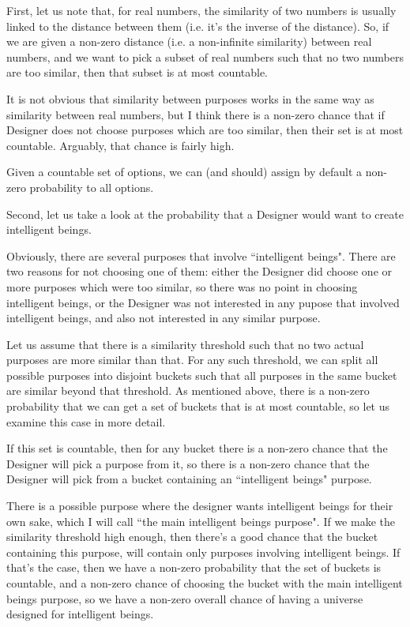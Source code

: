 \documentclass[a4paper
]{article}
\newcommand{\ghilimele}[1]{``#1"}
\begin{document}
First, let us note that, for real numbers, the similarity of two numbers
is usually linked to the distance between them
(i.e. it's the inverse of the distance).
So, if we are given a
non-zero distance (i.e. a non-infinite similarity) between real numbers,
and we want to pick a subset of real numbers such that no two numbers are
too similar, then that subset is at most countable.

It is not obvious that
similarity between purposes works in the same way as similarity between
real numbers, but I think there is a non-zero chance
that if Designer does not choose purposes which are too similar,
then their set is at most countable.
Arguably, that chance is fairly high.

Given a countable set of options, we can (and should) assign by default
a non-zero probability to all options.

Second, let us take a look at the probability that a Designer would want to
create intelligent beings.

Obviously, there are several purposes that involve
\ghilimele{intelligent beings}.
There are two reasons for not choosing one
of them: either the Designer did choose one or more purposes which were
too similar, so there was no point in choosing intelligent beings,
or the Designer was not interested in any pupose that involved intelligent
beings, and also not interested in any similar purpose.

Let us assume that there is a similarity threshold such that no two actual
purposes are more similar than that.
For any such threshold, we can split all possible purposes into disjoint
buckets such that all purposes in the same bucket are similar beyond that
threshold. As mentioned above, there is a non-zero
probability that we can get a set of buckets that is at most countable,
so let us examine this case in more detail.

If this set is countable, then for any bucket there is a non-zero chance that
the Designer will pick a purpose from it, so there is a non-zero chance that
the Designer will pick from a bucket containing an
\ghilimele{intelligent beings} purpose.

There is a possible purpose where the designer wants intelligent beings
for their own sake, which I will call
\ghilimele{the main intelligent beings purpose}.
If we make the similarity threshold
high enough, then there's a good chance that the bucket containing
this purpose, will contain only purposes involving intelligent beings.
If that's the case, then we
have a non-zero probability that the set of buckets is countable, and a
non-zero chance of choosing the bucket with the main intelligent beings purpose,
so we have a non-zero overall chance of having a universe designed for
intelligent beings.
\end{document}
